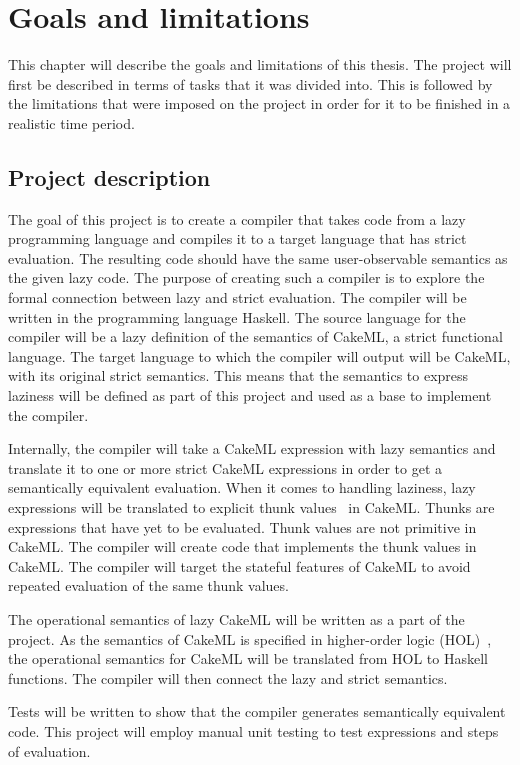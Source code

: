 \chapter{Goals and limitations}
This chapter will describe the goals and limitations of this thesis. The project
will first be described in terms of tasks that it was divided into. This is
followed by the limitations that were imposed on the project in order for it to
be finished in a realistic time period.

\section{Project description}
\label{intro:project}
The goal of this project is to create a compiler that takes code from a lazy
programming language and compiles it to a target language that has strict
evaluation. The resulting code should have the same user-observable semantics
as the given lazy code.
The purpose of creating such a compiler is to explore the formal
connection between lazy and strict evaluation. The compiler will be written in
the programming language Haskell. The source language for the compiler will be
a lazy definition of the semantics of CakeML, a strict functional language.
The target language to which the
compiler will output will be CakeML, with its original strict semantics. This
means that the semantics to express laziness will be defined as part of this
project and used as a base to implement the compiler.

Internally, the compiler will take a
CakeML expression with lazy semantics and translate it to one
or more strict CakeML expressions in order to get a semantically equivalent
evaluation. When it comes to handling laziness, lazy expressions will be
translated to explicit thunk values~\cite{Ingerman:1961:TWC:366062.366084} in
CakeML. Thunks are expressions that have yet to be evaluated. Thunk values are
not primitive in CakeML. The compiler will create code that
implements the thunk values in CakeML. The compiler will target the stateful
features of CakeML to avoid repeated evaluation of the same thunk values.

The operational semantics of lazy CakeML will be written as a part of the
project. As the semantics of CakeML is specified in higher-order logic
(HOL)~\cite{HOLInter57:online},
the operational semantics for CakeML will be translated from HOL to Haskell
functions. The compiler will then connect the lazy and strict semantics.

Tests will be written to show that the compiler generates semantically
equivalent code. This project will employ manual unit testing to test
expressions and steps of evaluation.

